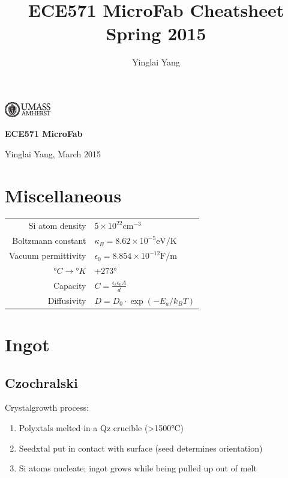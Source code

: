 \documentclass[6pt,letterpaper]{scrartcl}
\title{ECE571 MicroFab Cheatsheet Spring 2015}
\author{Yinglai Yang}
\renewcommand{\emph}[1]{\textsf{\textbf{#1}}}
\begin{document}
\begin{multicols}{3}

\parbox{2.3cm}{
	\includegraphics[width=2cm]{./img/UMASS.eps}
}
\parbox{4cm}{
	\emph{\huge{ECE571 MicroFab}}
}










\begin{center}
	Yinglai Yang, March 2015
\end{center}
\section{Miscellaneous}

\begin{tabular}{ r | l }
Si atom density & $5\times 10^{22} \mathrm{cm}^{-3}$ \\
Boltzmann constant & $\kappa_B = 8.62\times 10^{-5} \mathrm{eV/K}$ \\
Vacuum permittivity & $\epsilon_0 = 8.854\times 10^{-12} \mathrm{F/m}$ \\
$°C \rightarrow °K$ & $+273°$ \\
Capacity & $C = \frac{\epsilon_r \epsilon_0 A}{d}$ \\
Diffusivity & $D = D_0 \cdot \exp(-E_a/k_B T)$
\end{tabular}

\section{Ingot}

\subsection{Czochralski}
Crystalgrowth process:
\begin{enumerate}
	\item Polyxtals melted in a Qz crucible (>1500°C)
	\item Seedxtal put in contact with surface (seed determines orientation)
	\item Si atoms nucleate; ingot grows while being pulled up out of melt
\end{enumerate}


\end{multicols}
\end{document}
